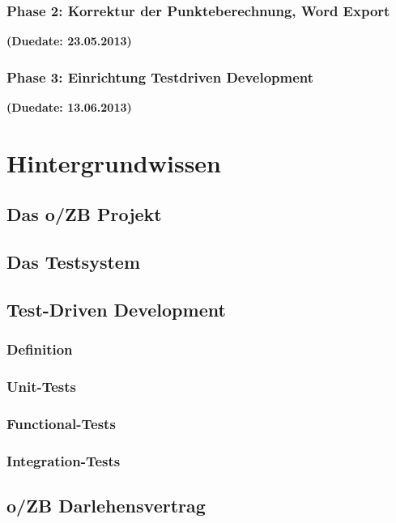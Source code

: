 \documentclass[12pt,             %
               a4paper,          %
               listof=totoc,     %
               index=totoc,      %
               bibliography=totoc,%
               oneside,         %
               BCOR1cm,          %
               english   %
               ]{scrbook}
\begin{document}
\subsection{Phase 2: Korrektur der Punkteberechnung, Word Export}
\textbf {(Duedate: 23.05.2013)}\\

\subsection{Phase 3: Einrichtung Testdriven Development}
\textbf {(Duedate: 13.06.2013)}\\


\clearpage
\chapter{Hintergrundwissen}
\section{Das o/ZB Projekt}

\section{Das Testsystem}\label{sec:Das_Testsystem}

\section{Test-Driven Development}
\subsection{Definition}
\subsection{Unit-Tests}
\subsection{Functional-Tests}
\subsection{Integration-Tests}

\section{o/ZB Darlehensvertrag}
\end{document}
